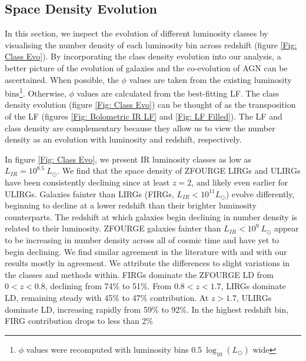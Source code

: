\subsection{Space Density Evolution}
\label{Sec: Class Density}

In this section, we inspect the evolution of different luminosity classes by visualising the number density of each luminosity bin across redshift (figure \ref{Fig: Class Evo}). By incorporating the class density evolution into our analysis, a better picture of the evolution of galaxies and the co-evolution of AGN can be ascertained. When possible, the $\phi$ values are taken from the existing luminosity bins\footnote{$\phi$ values were recomputed with luminosity bins $0.5\ \log_{10}(L_{\odot})$ wide}. Otherwise, $\phi$ values are calculated from the best-fitting LF. The class density evolution (figure \ref{Fig: Class Evo}) can be thought of as the transposition of the LF (figures \ref{Fig: Bolometric IR LF} and \ref{Fig: LF Filled}). The LF and class density are complementary because they allow us to view the number density as an evolution with luminosity and redshift, respectively. 

In figure \ref{Fig: Class Evo}, we present IR luminosity classes as low as $L_{IR}=10^{8.5}\ L_{\odot}$. We find that the space density of ZFOURGE LIRGs and ULIRGs have been consistently declining since at least $z=2$, and likely even earlier for ULIRGs. Galaxies fainter than LIRGs (FIRGs, $L_{IR} < 10^{11} L_{\odot}$) evolve differently, beginning to decline at a lower redshift than their brighter luminosity counterparts. The redshift at which galaxies begin declining in number density is related to their luminosity. ZFOURGE galaxies fainter than $L_{IR} < 10^{9}\ L_{\odot}$ appear to be increasing in number density across all of cosmic time and have yet to begin declining. We find similar agreement in the literature with \cite{rodighiero_mid-_2010} and \cite{gruppioni_herschel_2013} with our results mostly in agreement. We attribute the differences to slight variations in the classes and methods within. FIRGs dominate the ZFOURGE LD from $0<z<0.8$, declining from 74\% to 51\%. From $0.8<z<1.7$, LIRGs dominate LD, remaining steady with 45\% to 47\% contribution. At $z>1.7$, ULIRGs dominate LD, increasing rapidly from 59\% to 92\%. In the highest redshift bin, FIRG contribution drops to less than 2\%

